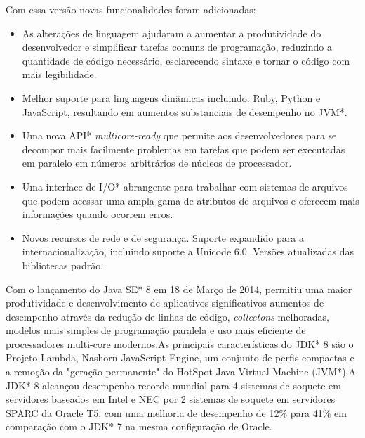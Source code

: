 	Com essa versão novas funcionalidades foram adicionadas:
	\begin{itemize}
	  \item As alterações de linguagem ajudaram a aumentar a produtividade do desenvolvedor e simplificar tarefas comuns de programação, reduzindo a quantidade de código necessário, esclarecendo sintaxe e tornar o código com mais legibilidade.
	  \item Melhor suporte para linguagens dinâmicas incluindo: Ruby, Python e JavaScript, resultando em aumentos substanciais de desempenho no JVM*.
	  \item Uma nova API* {\it multicore-ready} que permite aos desenvolvedores para se decompor mais facilmente problemas em tarefas que podem ser executadas em paralelo em números arbitrários de núcleos de processador.
	  \item Uma interface de I/O* abrangente para trabalhar com sistemas de arquivos que podem acessar uma ampla gama de atributos de arquivos e oferecem mais informações quando ocorrem erros.
	  \item Novos recursos de rede e de segurança. Suporte expandido para a internacionalização, incluindo suporte a Unicode 6.0. Versões atualizadas das bibliotecas padrão.\\
	\end{itemize}

	Com o lançamento do Java SE* 8 em 18 de Março de 2014, permitiu uma maior produtividade e desenvolvimento de aplicativos significativos aumentos de desempenho através da redução de linhas de código, {\it collectons} melhoradas, modelos mais simples de programação paralela e uso mais eficiente de processadores multi-core modernos.As principais características do JDK* 8 são o Projeto Lambda, Nashorn JavaScript Engine, um conjunto de perfis compactas e a remoção da "geração permanente" do HotSpot Java Virtual Machine (JVM*).A JDK* 8 alcançou desempenho recorde mundial para 4 sistemas de soquete em servidores baseados em Intel e NEC por 2 sistemas de soquete em servidores SPARC da Oracle T5, com uma melhoria de desempenho de 12\% para 41\% em comparação com o JDK* 7 na mesma configuração de Oracle.\\
	
